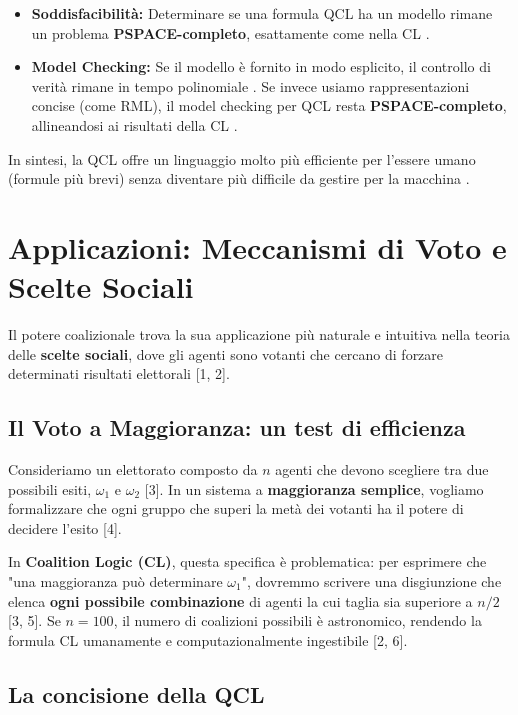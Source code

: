 \documentclass[12pt]{article}
\begin{document}
\begin{itemize}
	\item \textbf{Soddisfacibilità:} Determinare se una formula QCL ha un
	      modello rimane un problema \textbf{PSPACE-completo}, esattamente come
	      nella CL .
	\item \textbf{Model Checking:} Se il modello è fornito in modo esplicito,
	      il controllo di verità rimane in tempo polinomiale . Se invece
	      usiamo rappresentazioni concise (come RML), il model checking per QCL
	      resta \textbf{PSPACE-completo}, allineandosi ai risultati della CL .
\end{itemize}

In sintesi, la QCL offre un linguaggio molto più efficiente per l'essere
umano (formule più brevi) senza diventare più difficile da gestire per
la macchina .
\section{Applicazioni: Meccanismi di Voto e Scelte Sociali}

Il potere coalizionale trova la sua applicazione più naturale e intuitiva nella
teoria delle \textbf{scelte sociali}, dove gli agenti sono votanti che cercano
di forzare determinati risultati elettorali [1, 2].

\subsection{Il Voto a Maggioranza: un test di efficienza}

Consideriamo un elettorato composto da $n$ agenti che devono scegliere tra due
possibili esiti, $\omega_1$ e $\omega_2$ [3]. In un sistema a
\textbf{maggioranza semplice}, vogliamo formalizzare che ogni gruppo che
superi la metà dei votanti ha il potere di decidere l'esito [4].

In \textbf{Coalition Logic (CL)}, questa specifica è problematica: per
esprimere che "una maggioranza può determinare $\omega_1$", dovremmo scrivere
una disgiunzione che elenca \textbf{ogni possibile combinazione} di agenti
la cui taglia sia superiore a $n/2$ [3, 5]. Se $n=100$, il numero di
coalizioni possibili è astronomico, rendendo la formula CL umanamente e
computazionalmente ingestibile [2, 6].

\subsection{La concisione della QCL}
\end{document}
